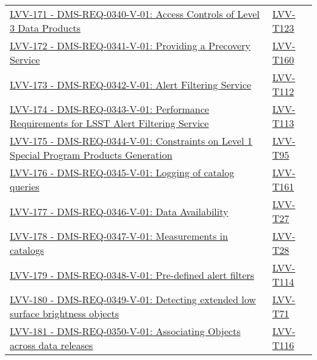 \begin{longtable}[]{p{13cm}p{3cm}}
\href{https://jira.lsstcorp.org/browse/LVV-171}{LVV-171 -
DMS-REQ-0340-V-01: Access Controls of Level 3 Data Products} &
\protect\hyperlink{lvv-t123---verify-implementation-of-access-controls-of-level-3-data-products-dms-req-0340}{LVV-T123}\tabularnewline
\href{https://jira.lsstcorp.org/browse/LVV-172}{LVV-172 -
DMS-REQ-0341-V-01: Providing a Precovery Service} &
\protect\hyperlink{lvv-t160---verify-implementation-of-providing-a-precovery-service-dms-req-0341}{LVV-T160}\tabularnewline
\href{https://jira.lsstcorp.org/browse/LVV-173}{LVV-173 -
DMS-REQ-0342-V-01: Alert Filtering Service} &
\protect\hyperlink{lvv-t112---verify-implementation-of-alert-filtering-service-dms-req-0342}{LVV-T112}\tabularnewline
\href{https://jira.lsstcorp.org/browse/LVV-174}{LVV-174 -
DMS-REQ-0343-V-01: Performance Requirements for LSST Alert Filtering
Service} &
\protect\hyperlink{lvv-t113---verify-implementation-of-performance-requirements-for-lsst-alert-filtering-service--dms-req-0343}{LVV-T113}\tabularnewline
\href{https://jira.lsstcorp.org/browse/LVV-175}{LVV-175 -
DMS-REQ-0344-V-01: Constraints on Level 1 Special Program Products
Generation} &
\protect\hyperlink{lvv-t95---verify-implementation-of-constraints-on-level-special-program-products-generation-dms-req-0344}{LVV-T95}\tabularnewline
\href{https://jira.lsstcorp.org/browse/LVV-176}{LVV-176 -
DMS-REQ-0345-V-01: Logging of catalog queries} &
\protect\hyperlink{lvv-t161---verify-implementation-of-logging-of-catalog-queries-dms-req-0345}{LVV-T161}\tabularnewline
\href{https://jira.lsstcorp.org/browse/LVV-177}{LVV-177 -
DMS-REQ-0346-V-01: Data Availability} &
\protect\hyperlink{lvv-t27---verify-implementation-of-data-availability-dms-req-0346}{LVV-T27}\tabularnewline
\href{https://jira.lsstcorp.org/browse/LVV-178}{LVV-178 -
DMS-REQ-0347-V-01: Measurements in catalogs} &
\protect\hyperlink{lvv-t28---verify-implementation-of-measurements-in-catalogs-dms-req-0347}{LVV-T28}\tabularnewline
\href{https://jira.lsstcorp.org/browse/LVV-179}{LVV-179 -
DMS-REQ-0348-V-01: Pre-defined alert filters} &
\protect\hyperlink{lvv-t114---verify-implementation-of-pre-defined-alert-filters-dms-req-0348}{LVV-T114}\tabularnewline
\href{https://jira.lsstcorp.org/browse/LVV-180}{LVV-180 -
DMS-REQ-0349-V-01: Detecting extended low surface brightness objects} &
\protect\hyperlink{lvv-t71---verify-implementation-of-detecting-extended--low-surface-brightness-objects-dms-req-0349}{LVV-T71}\tabularnewline
\href{https://jira.lsstcorp.org/browse/LVV-181}{LVV-181 -
DMS-REQ-0350-V-01: Associating Objects across data releases} &
\protect\hyperlink{lvv-t116---verify-implementation-of-associating-objects-across-data-releases-dms-req-0350}{LVV-T116}\tabularnewline

\end{longtable}

